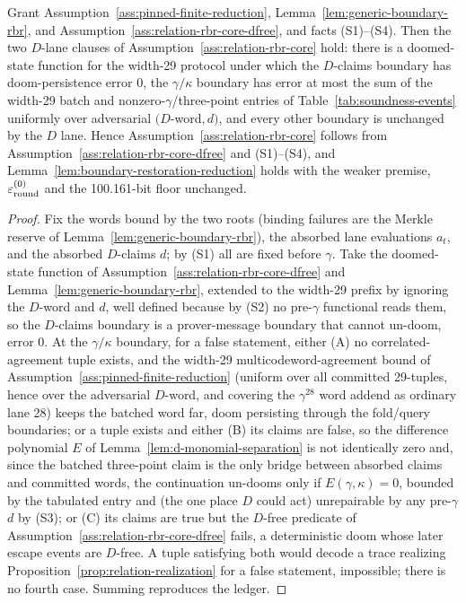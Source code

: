 \begin{lemma}
\label{lem:d-lane-rbr}
Grant Assumption~\ref{ass:pinned-finite-reduction},
Lemma~\ref{lem:generic-boundary-rbr}, and
Assumption~\ref{ass:relation-rbr-core-dfree}, and facts
\textup{(S1)--(S4)}.  Then the two \(D\)-lane clauses of
Assumption~\ref{ass:relation-rbr-core} hold: there is a doomed-state function
for the width-29 protocol under which the \(D\)-claims boundary has
doom-persistence error \(0\), the \(\gamma/\kappa\) boundary has error at most
the sum of the width-29 batch and nonzero-\(\gamma\)/three-point entries of
Table~\ref{tab:soundness-events} uniformly over adversarial \((D\)-word\(,d)\),
and every other boundary is unchanged by the \(D\) lane.  Hence
Assumption~\ref{ass:relation-rbr-core} follows from
Assumption~\ref{ass:relation-rbr-core-dfree} and \textup{(S1)--(S4)}, and
Lemma~\ref{lem:boundary-restoration-reduction} holds with the weaker premise,
\(\varepsilon_{\rm round}^{(0)}\) and the 100.161-bit floor unchanged.
\end{lemma}

\begin{proof}
Fix the words bound by the two roots (binding failures are the Merkle reserve
of Lemma~\ref{lem:generic-boundary-rbr}), the absorbed lane evaluations
\(a_t\), and the absorbed \(D\)-claims \(d\); by \textup{(S1)} all are fixed
before \(\gamma\).  Take the doomed-state function of
Assumption~\ref{ass:relation-rbr-core-dfree} and
Lemma~\ref{lem:generic-boundary-rbr}, extended to the width-29 prefix by
ignoring the \(D\)-word and \(d\), well defined because by \textup{(S2)} no
pre-\(\gamma\) functional reads them, so the \(D\)-claims boundary is a
prover-message boundary that cannot un-doom, error \(0\).  At the
\(\gamma/\kappa\) boundary, for a false statement, either \textup{(A)} no
correlated-agreement tuple exists, and the width-29 multicodeword-agreement
bound of Assumption~\ref{ass:pinned-finite-reduction} (uniform over all
committed 29-tuples, hence over the adversarial \(D\)-word, and covering the
\(\gamma^{28}\) word addend as ordinary lane 28) keeps the batched word far,
doom persisting through the fold/query boundaries; or a tuple exists and either
\textup{(B)} its claims are false, so the difference polynomial \(E\) of
Lemma~\ref{lem:d-monomial-separation} is not identically zero and, since the
batched three-point claim is the only bridge between absorbed claims and
committed words, the continuation un-dooms only if \(E(\gamma,\kappa)=0\),
bounded by the tabulated entry and (the one place \(D\) could act) unrepairable
by any pre-\(\gamma\) \(d\) by \textup{(S3)}; or \textup{(C)} its claims are true
but the \(D\)-free predicate of Assumption~\ref{ass:relation-rbr-core-dfree}
fails, a deterministic doom whose later escape events are \(D\)-free.  A tuple
satisfying both would decode a trace realizing
Proposition~\ref{prop:relation-realization} for a false statement, impossible;
there is no fourth case.  Summing reproduces the ledger.
\end{proof}

